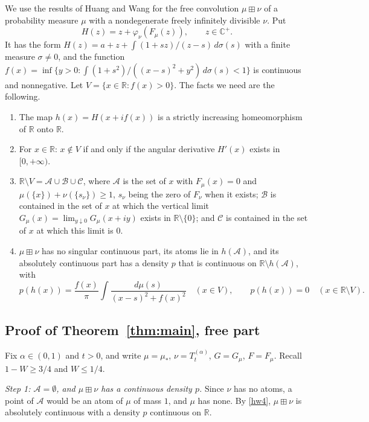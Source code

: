 \documentclass[11pt]{amsart}
\theoremstyle{definition}
\theoremstyle{remark}
\numberwithin{equation}{section}
\newcommand{\R}{\mathbb R}
\newcommand{\C}{\mathbb C}
\newcommand{\bp}{\boxplus}
\begin{document}
We use the results of Huang and Wang \cite[Section 3]{HW} for the free convolution $\mu\bp\nu$ of a probability measure $\mu$ with a nondegenerate freely infinitely divisible $\nu$. Put
\begin{equation}\label{eq:H}
H(z)=z+\varphi_\nu(F_\mu(z)),\qquad z\in\C^+ .
\end{equation}
It has the form $H(z)=a+z+\int(1+sz)/(z-s)\,d\sigma(s)$ with a finite measure $\sigma\ne0$, and the function $f(x)=\inf\{y>0:\int(1+s^2)/((x-s)^2+y^2)\,d\sigma(s)<1\}$ is continuous and nonnegative. Let $V=\{x\in\R:f(x)>0\}$. The facts we need are the following.
\begin{enumerate}[label=(HW\arabic*)]
\item\label{hw1} \cite[Proposition 3.1(5)]{HW} The map $h(x)=H(x+if(x))$ is a strictly increasing homeomorphism of $\R$ onto $\R$.
\item\label{hw2} \cite[Proposition 3.2]{HW} For $x\in\R$: $x\notin V$ if and only if the angular derivative $H'(x)$ exists in $[0,+\infty)$.
\item\label{hw3} \cite[Theorem 3.6, Remark 3.7]{HW} $\R\setminus V=\mathcal A\cup\mathcal B\cup\mathcal C$, where $\mathcal A$ is the set of $x$ with $F_\mu(x)=0$ and $\mu(\{x\})+\nu(\{s_\nu\})\ge1$, $s_\nu$ being the zero of $F_\nu$ when it exists; $\mathcal B$ is contained in the set of $x$ at which the vertical limit $G_\mu(x)=\lim_{y\downarrow0}G_\mu(x+iy)$ exists in $\R\setminus\{0\}$; and $\mathcal C$ is contained in the set of $x$ at which this limit is $0$.
\item\label{hw4} \cite[Example 3.8, Theorem 3.9]{HW} $\mu\bp\nu$ has no singular continuous part, its atoms lie in $h(\mathcal A)$, and its absolutely continuous part has a density $p$ that is continuous on $\R\setminus h(\mathcal A)$, with
\[
p(h(x))=\frac{f(x)}{\pi}\int\frac{d\mu(s)}{(x-s)^2+f(x)^2}\quad(x\in V),\qquad p(h(x))=0\quad(x\in\R\setminus V).
\]
\end{enumerate}

\subsection{Proof of Theorem~\ref{thm:main}, free part}
Fix $\alpha\in(0,1)$ and $t>0$, and write $\mu=\mu_\ast$, $\nu=T^{(\alpha)}_t$, $G=G_\mu$, $F=F_\mu$. Recall $1-W\ge3/4$ and $W\le1/4$.

\emph{Step 1: $\mathcal A=\emptyset$, and $\mu\bp\nu$ has a continuous density $p$.} Since $\nu$ has no atoms, a point of $\mathcal A$ would be an atom of $\mu$ of mass $1$, and $\mu$ has none. By \ref{hw4}, $\mu\bp\nu$ is absolutely continuous with a density $p$ continuous on $\R$.
\end{document}
